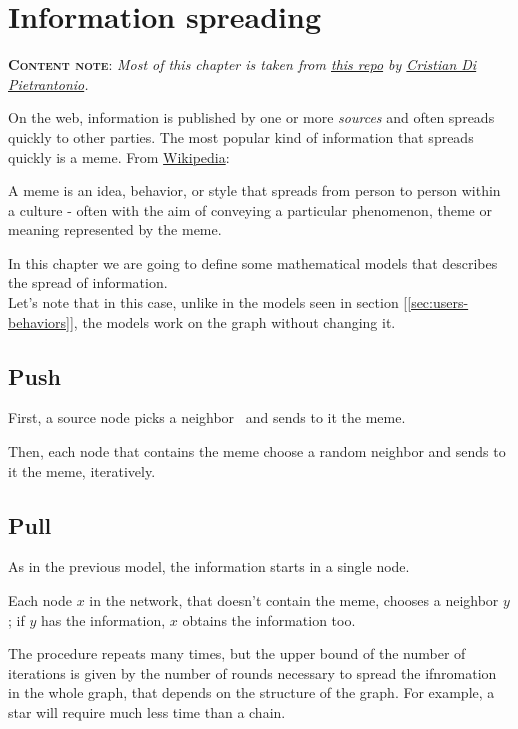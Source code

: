 \chapter[Information spreading]{Information spreading}

\textbf{\textsc{Content note}}: \emph{Most of this chapter is taken from \href{https://github.com/Halolegend94/uni_social_behavioral_networks/blob/master/chapters/ch01-meme-flow.tex}{this repo} by \href{https://github.com/Halolegend94}{Cristian Di Pietrantonio}.}
\vspace{2ex}

On the web, information is published by one or more \emph{sources} and often spreads quickly to other parties. The most popular kind of information that spreads quickly is a meme. From \href{https://en.wikipedia.org/wiki/Meme}{Wikipedia}:

\begin{defn}[Meme]
	A meme is an idea, behavior, or style that spreads from person to person within a culture - often with the aim of conveying a particular phenomenon, theme or meaning represented by the meme.
\end{defn}

In this chapter we are going to define some mathematical models that describes the spread of information.\\
Let's note that in this case, unlike in the models seen in section [\ref{sec:users-behaviors}], the models work on the graph without changing it.

\section{Push}

First, a source node picks a neighbor \uar\ and sends to it the meme.

Then, each node that contains the meme choose a random neighbor and sends to it the meme, iteratively.


\section{Pull}

As in the previous model, the information starts in a single node.

Each node $x$ in the network, that doesn't contain the meme, chooses a neighbor $y$ \uar; if $y$ has the information, $x$ obtains the information too.

The procedure repeats many times, but the upper bound of the number of iterations is given by the number of rounds necessary to spread the ifnromation in the whole graph, that depends on the structure of the graph. For example, a star will require much less time than a chain.

